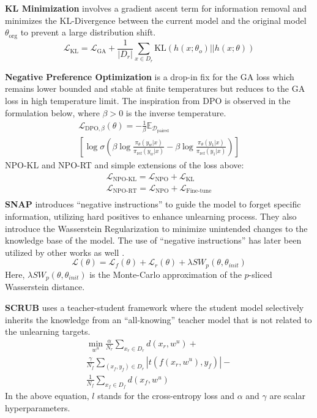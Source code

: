 \textbf{KL Minimization} \citet{maini2024tofu} involves a gradient ascent term for information removal and minimizes the KL-Divergence between the current model and the original model $\theta_{\text{org}}$ to prevent a large distribution shift. $$\mathcal{L}_{\text{KL}} = \mathcal{L}_{\text{GA}} + \frac{1}{|D_r|} \sum_{x \in D_r} \text{KL}(h(x; \theta_o)||h(x; \theta))$$

\textbf{Negative Preference Optimization} \citet{zhang2024negativepreferenceoptimizationcatastrophic} is a drop-in fix for the GA loss which remains lower bounded and stable at finite temperatures but reduces to the GA loss in high temperature limit. The inspiration from DPO \citep{rafailov2024directpreferenceoptimizationlanguage} is observed in the formulation below, where $\beta  > 0$ is the inverse temperature. 
\begin{align*}
\mathcal{L}_{\text{DPO},\beta}(\theta) = - \frac{1}{\beta}\mathbb{E}_{\mathcal{D}_{\text{paired}}} \\
\left[\log \sigma \left(\beta \log \frac{\pi_{\theta}(y_w | x)}{\pi_{\text{ref}}(y_w | x)} - \beta \log \frac{\pi_{\theta}(y_1 | x)}{\pi_{\text{ref}}(y_1 | x)}\right)\right]
\end{align*}
NPO-KL and NPO-RT and simple extensions of the loss above: 
\begin{align*}
\mathcal{L}_{\text{NPO-KL}} = \mathcal{L}_{\text{NPO}} +  \mathcal{L}_{\text{KL}} \\
\mathcal{L}_{\text{NPO-RT}} = \mathcal{L}_{\text{NPO}} +  \mathcal{L}_{\text{Fine-tune}} \\
\end{align*}
\textbf{SNAP} \citet{sarlin2023snapselfsupervisedneuralmaps} introduces \enquote{negative instructions} to guide the model to forget specific information, utilizing hard positives to enhance unlearning process. They also introduce the Wasserstein Regularization to minimize unintended changes to the knowledge base of the model. The use of \enquote{negative instructions} has later been utilized by other works as well \cite{sinha2024unstarunlearningselftaughtantisample}. $$\mathcal{L}(\theta) = \mathcal{L}_{f}(\theta) + \mathcal{L}_{r}(\theta) + \lambda SW_{p}(\theta, \theta_{init})$$
Here, $\lambda SW_{p}(\theta, \theta_{init})$ is the Monte-Carlo approximation of the $p$-sliced Wasserstein distance.

\textbf{SCRUB} \citet{kurmanji2023machineunlearninglearneddatabases} uses a teacher-student framework where the student model selectively inherits the knowledge from an \enquote{all-knowing} teacher model that is not related to the unlearning targets. 
\begin{align*}
\min_{w^u} \frac{\alpha}{N_r} \sum_{x_r \in D_r} d(x_r, w^u) + \\ \frac{\gamma}{N_f} \sum_{(x_f, y_f) \in D_r} |t(f(x_r, w^u), y_f)| - \\ \frac{1}{N_f} \sum_{x_f \in D_f} d(x_f, w^u)    
\end{align*}
In the above equation, $l$ stands for the cross-entropy loss and $\alpha$ and $\gamma$ are scalar hyperparameters.

